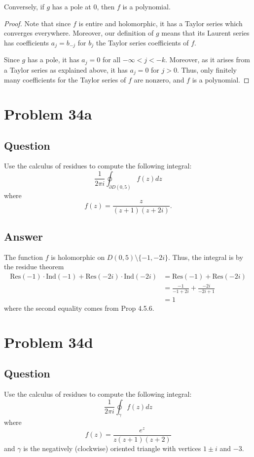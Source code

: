 \documentclass[11pt]{article}
\begin{document}
Conversely, if $g$ has a pole at 0, then $f$ is a polynomial.
\begin{proof}
Note that since $f$ is entire and holomorphic, it has a Taylor series which converges everywhere. Moreover, our definition of $g$ means that its Laurent series has coefficients $a_j = b_{-j}$ for $b_{j}$ the Taylor series coefficients of $f$. 

Since $g$ has a pole, it has $a_j = 0$ for all $- \infty < j < -k$. Moreover, as it arises from a Taylor series as explained above, it has $a_j=0$ for $j> 0$. Thus, only finitely many coefficients for the Taylor series of $f$ are nonzero, and $f$ is a polynomial.
\end{proof}

\section{Problem 34a}
\subsection{Question}
Use the calculus of residues to compute the following integral:
\[\frac{1}{2 \pi i} \oint_{\partial D(0,5)} f(z) dz\]
where 
\[f(z) = \frac{z}{(z+1)(z+ 2 i )}.\]
\subsection{Answer}
The function $f$ is holomorphic on $D(0,5) \setminus \{-1, -2i\}$. Thus, the integral is by the residue theorem
\begin{align*}\mbox{Res}(-1) \cdot \mbox{Ind}(-1) + \mbox{Res}(-2i) \cdot \mbox{Ind}(-2i) &= \mbox{Res}(-1) + \mbox{Res}(-2i) \\
&=\frac{-1}{-1+2 i}+ \frac{-2i}{-2i+1} \\
&= 1\end{align*}
where the second equality comes from Prop 4.5.6.

\section{Problem 34d}
\subsection{Question}
Use the calculus of residues to compute the following integral:
\[\frac{1}{2 \pi i} \oint_\gamma f(z) dz \]
where 
\[f(z) = \frac{e^z}{z(z+1)(z+2)}\]
and $\gamma$ is the negatively (clockwise) oriented triangle with vertices $1\pm i$ and $-3$.
\end{document}
